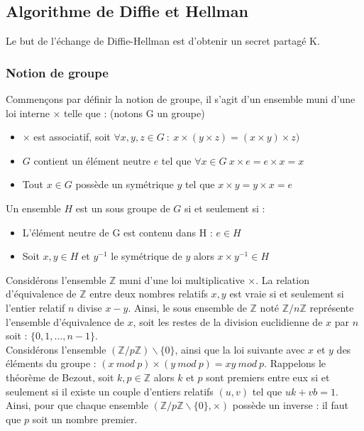 
\subsection{Algorithme de Diffie et Hellman}
Le but de l'échange de Diffie-Hellman est d'obtenir un secret partagé K.
\subsubsection{Notion de groupe} \label{Notion de groupe}
Commençons par définir la notion de groupe, il s'agit d'un ensemble muni d'une loi interne $\times$ telle que : (notons G un groupe)\cite{noauthor_groupe_nodate}
\begin{itemize}
    \item $\times$ est associatif, soit $\forall x,y,z \in G \: : \: x\times (y\times z)=(x\times y)\times z)$
    \item $G$ contient un élément neutre $e$ tel que $\forall x \in G \: x\times e = e \times x = x$
    \item Tout $x \in G$ possède un symétrique $y$ tel que $x\times y=y\times x =e$\\
\end{itemize}

Un ensemble $H$ est un sous groupe de $G$ si et seulement si \cite{noauthor_sous-groupe_nodate}:
\begin{itemize}
    \item L'élément neutre de G est contenu dans H : $e\in H$
    \item Soit $x,y \in H$ et $y^{-1}$ le symétrique de $y$ alors $x\times y^{-1} \in H$\\
\end{itemize}

Considérons l'ensemble $\mathbb{Z}$ muni d'une loi multiplicative $\times$. La relation d'équivalence de $\mathbb{Z}$ entre deux nombres relatifs $x,y$ est vraie si et seulement si l'entier relatif $n$ divise $x-y$. Ainsi, le sous ensemble de $\mathbb{Z}$ noté $\mathbb{Z}/n\mathbb{Z}$ représente l'ensemble d'équivalence de $x$, soit les restes de la division euclidienne de $x$ par $n$ soit : $\{0,1,...,n-1\}$.\cite{polytechnique_groupepdf_nodate}\\

Considérons l'ensemble $(\mathbb{Z}/p\mathbb{Z}) \backslash \{0\}$, ainsi que la loi suivante avec $x$ et $y$ des éléments du groupe : $(x \: mod \: p)\times(y \: mod \: p) = xy \: mod \: p$. Rappelons le théorème de Bezout, soit $k,p\in \mathbb{Z}$ alors $k$ et $p$ sont premiers entre eux si et seulement si il existe un couple d'entiers relatifs $(u,v)$ tel que $uk + vb=1$. Ainsi, pour que chaque ensemble $(\mathbb{Z}/p\mathbb{Z} \backslash \{0\}, \times)$ possède un inverse : il faut que $p$ soit un nombre premier.\cite{polytechnique_groupepdf_nodate}\\

